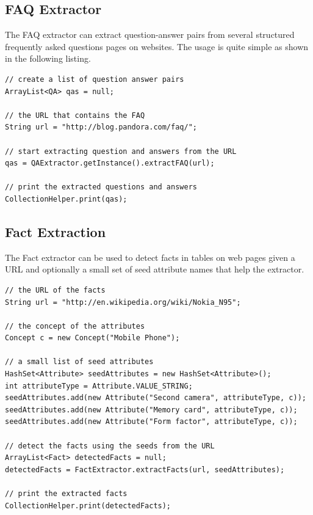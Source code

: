 \documentclass[a4paper,twoside]{book}      %
\begin{document}
\subsection{FAQ Extractor}
The FAQ extractor can extract question-answer pairs from several structured frequently asked questions pages on websites. The usage is quite simple as shown in the following listing.
\begin{codelisting}
\begin{lstlisting}[frame=tb]
// create a list of question answer pairs
ArrayList<QA> qas = null;

// the URL that contains the FAQ
String url = "http://blog.pandora.com/faq/";

// start extracting question and answers from the URL
qas = QAExtractor.getInstance().extractFAQ(url);

// print the extracted questions and answers
CollectionHelper.print(qas);
\end{lstlisting}
\end{codelisting}

\subsection{Fact Extraction}
The Fact extractor can be used to detect facts in tables on web pages given a URL and optionally a small set of seed attribute names that help the extractor.
\begin{codelisting}
\begin{lstlisting}[frame=tb]
// the URL of the facts
String url = "http://en.wikipedia.org/wiki/Nokia_N95";

// the concept of the attributes
Concept c = new Concept("Mobile Phone");

// a small list of seed attributes
HashSet<Attribute> seedAttributes = new HashSet<Attribute>();
int attributeType = Attribute.VALUE_STRING;
seedAttributes.add(new Attribute("Second camera", attributeType, c));
seedAttributes.add(new Attribute("Memory card", attributeType, c));
seedAttributes.add(new Attribute("Form factor", attributeType, c));

// detect the facts using the seeds from the URL
ArrayList<Fact> detectedFacts = null;
detectedFacts = FactExtractor.extractFacts(url, seedAttributes);
		
// print the extracted facts
CollectionHelper.print(detectedFacts);
\end{lstlisting}
\end{codelisting}
\end{document}
